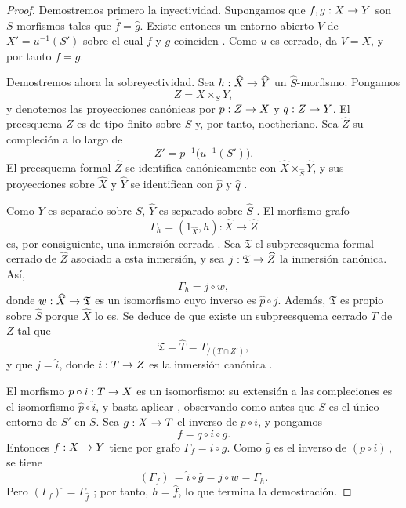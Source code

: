 \documentclass[oneside]{amsart}
\makeatletter
\newcommand{\ega@arrow}[2]{\mathchoice{#1}{#2}{#2}{#2}}
\renewcommand{\to}{\ega@arrow{\longrightarrow}{\rightarrow}}
\newcommand{\oldpage}[2][]{{\marginnote{\normalfont\textbf{#1}~|~#2}}\ignorespaces}
\makeatother
\begin{document}
\begin{proof}
Demostremos primero la inyectividad. Supongamos que $f,g:X\to Y$ son
$S$-morfismos tales que $\widehat{f}=\widehat{g}$. Existe entonces
un entorno abierto $V$ de $X'=u^{-1}(S')$ sobre el cual $f$ y $g$
coinciden . Como $u$ es cerrado,
 da $V=X$, y por tanto $f=g$.

Demostremos ahora la sobreyectividad. Sea
$h:\widehat{X}\to\widehat{Y}$ un
$\widehat{S}$-morfismo. Pongamos
\[
  Z=X\times_S Y,
\]
y denotemos las proyecciones canónicas por $p:Z\to X$ y
$q:Z\to Y$. El preesquema $Z$ es de tipo finito sobre $S$
 y, por tanto, noetheriano. Sea
$\widehat{Z}$ su compleción a lo largo de
\[
  Z'=p^{-1}\bigl(u^{-1}(S')\bigr).
\]
El preesquema formal $\widehat{Z}$ se identifica canónicamente con
$\widehat{X}\times_{\widehat{S}}\widehat{Y}$, y sus proyecciones
sobre $\widehat{X}$ y $\widehat{Y}$ se identifican con
$\widehat{p}$ y $\widehat{q}$ .

Como $Y$ es separado sobre $S$, $\widehat{Y}$ es separado sobre
$\widehat{S}$ . El morfismo grafo
\[
  \Gamma_h=(1_{\widehat{X}},h):
  \widehat{X}\longrightarrow\widehat{Z}
\]
es, por consiguiente, una inmersión cerrada . Sea
$\mathfrak{T}$ el subpreesquema formal cerrado de
$\widehat{Z}$ asociado a esta inmersión, y sea
$j:\mathfrak{T}\to\widehat{Z}$ la inmersión canónica. Así,
\[
  \Gamma_h=j\circ w,
\]
donde $w:\widehat{X}\to\mathfrak{T}$ es un isomorfismo
 cuyo inverso es
$\widehat{p}\circ j$. Además, $\mathfrak{T}$ es propio sobre
$\widehat{S}$ porque $\widehat{X}$ lo es. Se deduce de
 que existe un subpreesquema cerrado $T$ de $Z$
tal que
\[
  \mathfrak{T}
  =\widehat{T}
  =T_{/(T\cap Z')},
\]
y que $j=\widehat{i}$, donde $i:T\to Z$ es la inmersión
canónica .

El morfismo $p\circ i:T\to X$ es un isomorfismo: su extensión a
las compleciones es el isomorfismo
$\widehat{p}\circ\widehat{i}$, y basta aplicar
, observando como antes que $S$ es el único
entorno de $S'$ en $S$.
\oldpage[III]{157}
Sea $g:X\to T$ el inverso de $p\circ i$, y pongamos
\[
  f=q\circ i\circ g.
\]
Entonces $f:X\to Y$ tiene por grafo $\Gamma_f=i\circ g$. Como
$\widehat{g}$ es el inverso de
$(p\circ i)^{\widehat{\,}}$, se tiene
\[
  (\Gamma_f)^{\widehat{\,}}
  =\widehat{i}\circ\widehat{g}
  =j\circ w
  =\Gamma_h.
\]
Pero $(\Gamma_f)^{\widehat{\,}}=\Gamma_{\widehat{f}}$
; por tanto, $h=\widehat{f}$, lo que termina la
demostración.
\end{proof}
\end{document}
